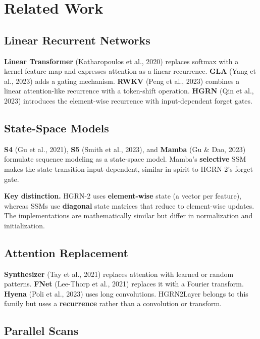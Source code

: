 \section{Related Work}

\subsection{Linear Recurrent Networks}

\textbf{Linear Transformer} (Katharopoulos et al., 2020) replaces softmax with a 
kernel feature map and expresses attention as a linear recurrence. \textbf{GLA} 
(Yang et al., 2023) adds a gating mechanism. \textbf{RWKV} (Peng et al., 2023) 
combines a linear attention-like recurrence with a token-shift operation. 
\textbf{HGRN} (Qin et al., 2023) introduces the element-wise recurrence with 
input-dependent forget gates.

\subsection{State-Space Models}

\textbf{S4} (Gu et al., 2021), \textbf{S5} (Smith et al., 2023), and \textbf{Mamba} (Gu \& 
Dao, 2023) formulate sequence modeling as a state-space model. Mamba's 
\textbf{selective} SSM makes the state transition input-dependent, similar in 
spirit to HGRN-2's forget gate.

\textbf{Key distinction.} HGRN-2 uses \textbf{element-wise} state (a vector per 
feature), whereas SSMs use \textbf{diagonal} state matrices that reduce to 
element-wise updates. The implementations are mathematically similar but 
differ in normalization and initialization.

\subsection{Attention Replacement}

\textbf{Synthesizer} (Tay et al., 2021) replaces attention with learned or 
random patterns. \textbf{FNet} (Lee-Thorp et al., 2021) replaces it with a 
Fourier transform. \textbf{Hyena} (Poli et al., 2023) uses long convolutions. 
HGRN2Layer belongs to this family but uses a \textbf{recurrence} rather than a 
convolution or transform.

\subsection{Parallel Scans}

